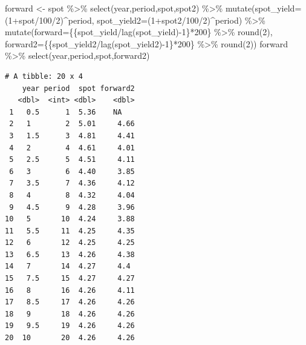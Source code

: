 \documentclass[
  a4paper,
  DIV=11,
  numbers=noendperiod]{scrreprt}
\newenvironment{Shaded}{\begin{snugshade}}{\end{snugshade}}
\newcommand{\AttributeTok}[1]{\textcolor[rgb]{0.40,0.45,0.13}{#1}}
\newcommand{\DecValTok}[1]{\textcolor[rgb]{0.68,0.00,0.00}{#1}}
\newcommand{\FunctionTok}[1]{\textcolor[rgb]{0.28,0.35,0.67}{#1}}
\newcommand{\NormalTok}[1]{\textcolor[rgb]{0.00,0.23,0.31}{#1}}
\newcommand{\OtherTok}[1]{\textcolor[rgb]{0.00,0.23,0.31}{#1}}
\newcommand{\SpecialCharTok}[1]{\textcolor[rgb]{0.37,0.37,0.37}{#1}}
\begin{document}
\begin{Shaded}
\begin{Highlighting}[]
\NormalTok{forward }\OtherTok{\textless{}{-}}\NormalTok{ spot }\SpecialCharTok{\%\textgreater{}\%} 
  \FunctionTok{select}\NormalTok{(year,period,spot,spot2) }\SpecialCharTok{\%\textgreater{}\%}  
  \FunctionTok{mutate}\NormalTok{(}\AttributeTok{spot\_yield=}\NormalTok{(}\DecValTok{1}\SpecialCharTok{+}\NormalTok{spot}\SpecialCharTok{/}\DecValTok{100}\SpecialCharTok{/}\DecValTok{2}\NormalTok{)}\SpecialCharTok{\^{}}\NormalTok{period,}
         \AttributeTok{spot\_yield2=}\NormalTok{(}\DecValTok{1}\SpecialCharTok{+}\NormalTok{spot2}\SpecialCharTok{/}\DecValTok{100}\SpecialCharTok{/}\DecValTok{2}\NormalTok{)}\SpecialCharTok{\^{}}\NormalTok{period) }\SpecialCharTok{\%\textgreater{}\%} 
  \FunctionTok{mutate}\NormalTok{(}\AttributeTok{forward=}\NormalTok{\{\{spot\_yield}\SpecialCharTok{/}\FunctionTok{lag}\NormalTok{(spot\_yield)}\SpecialCharTok{{-}}\DecValTok{1}\NormalTok{\}}\SpecialCharTok{*}\DecValTok{200}\NormalTok{\} }\SpecialCharTok{\%\textgreater{}\%} \FunctionTok{round}\NormalTok{(}\DecValTok{2}\NormalTok{),}
         \AttributeTok{forward2=}\NormalTok{\{\{spot\_yield2}\SpecialCharTok{/}\FunctionTok{lag}\NormalTok{(spot\_yield2)}\SpecialCharTok{{-}}\DecValTok{1}\NormalTok{\}}\SpecialCharTok{*}\DecValTok{200}\NormalTok{\} }\SpecialCharTok{\%\textgreater{}\%} \FunctionTok{round}\NormalTok{(}\DecValTok{2}\NormalTok{))}
\NormalTok{forward }\SpecialCharTok{\%\textgreater{}\%} \FunctionTok{select}\NormalTok{(year,period,spot,forward2)}
\end{Highlighting}
\end{Shaded}

\begin{verbatim}
# A tibble: 20 x 4
    year period  spot forward2
   <dbl>  <int> <dbl>    <dbl>
 1   0.5      1  5.36    NA   
 2   1        2  5.01     4.66
 3   1.5      3  4.81     4.41
 4   2        4  4.61     4.01
 5   2.5      5  4.51     4.11
 6   3        6  4.40     3.85
 7   3.5      7  4.36     4.12
 8   4        8  4.32     4.04
 9   4.5      9  4.28     3.96
10   5       10  4.24     3.88
11   5.5     11  4.25     4.35
12   6       12  4.25     4.25
13   6.5     13  4.26     4.38
14   7       14  4.27     4.4 
15   7.5     15  4.27     4.27
16   8       16  4.26     4.11
17   8.5     17  4.26     4.26
18   9       18  4.26     4.26
19   9.5     19  4.26     4.26
20  10       20  4.26     4.26
\end{verbatim}
\end{document}
